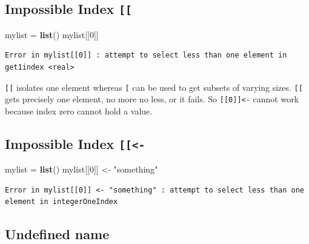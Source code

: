 \documentclass[]{book}
\newenvironment{Shaded}{\begin{snugshade}}{\end{snugshade}}
\newcommand{\DecValTok}[1]{\textcolor[rgb]{0.00,0.00,0.81}{#1}}
\newcommand{\KeywordTok}[1]{\textcolor[rgb]{0.13,0.29,0.53}{\textbf{#1}}}
\newcommand{\NormalTok}[1]{#1}
\newcommand{\StringTok}[1]{\textcolor[rgb]{0.31,0.60,0.02}{#1}}
\begin{document}
\hypertarget{impossible-double}{%
\subsection*{\texorpdfstring{Impossible Index \texttt{{[}{[}}}{Impossible Index {[}{[}}}\label{impossible-double}}
\addcontentsline{toc}{subsection}{Impossible Index \texttt{{[}{[}}}

\begin{Shaded}
\begin{Highlighting}[]
\NormalTok{mylist =}\StringTok{ }\KeywordTok{list}\NormalTok{()}
\NormalTok{mylist[[}\DecValTok{0}\NormalTok{]]}
\end{Highlighting}
\end{Shaded}

\begin{verbatim}
Error in mylist[[0]] : attempt to select less than one element in get1index <real>
\end{verbatim}

\texttt{{[}{[}} isolates one element whereas \texttt{{[}} can be used to get subsets of varying sizes.
\texttt{{[}{[}} gets precisely one element, no more no less, or it fails. So \texttt{{[}{[}0{]}{]}\textless{}-} cannot work because index zero cannot hold a value.

\hypertarget{impossible-double-assign}{%
\subsection*{\texorpdfstring{Impossible Index \texttt{{[}{[}\textless{}-}}{Impossible Index {[}{[}\textless{}-}}\label{impossible-double-assign}}
\addcontentsline{toc}{subsection}{Impossible Index \texttt{{[}{[}\textless{}-}}

\begin{Shaded}
\begin{Highlighting}[]
\NormalTok{mylist =}\StringTok{ }\KeywordTok{list}\NormalTok{()}
\NormalTok{mylist[[}\DecValTok{0}\NormalTok{]] <-}\StringTok{ "something"}
\end{Highlighting}
\end{Shaded}

\begin{verbatim}
Error in mylist[[0]] <- "something" : attempt to select less than one element in integerOneIndex
\end{verbatim}

\hypertarget{undefined-5}{%
\subsection*{Undefined name}\label{undefined-5}}
\end{document}
